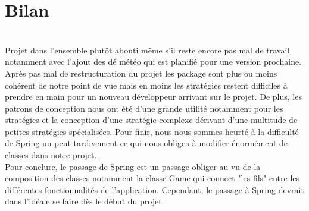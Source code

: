 \chapter{Bilan}

~\\Projet dans l'ensemble plutôt abouti même s'il reste encore pas mal de travail notamment avec l'ajout des dé météo qui est planifié pour une version prochaine. Après pas mal de restructuration du projet les package sont plus ou moins cohérent de notre point de vue mais en moins les stratégies restent difficiles à prendre en main pour un nouveau développeur arrivant sur le projet. De plus, les patrons de conception nous ont été d'une grande utilité notamment pour les stratégies et la conception d'une stratégie complexe dérivant d'une multitude de petites stratégies spécialisées. Pour finir, nous nous sommes heurté à la difficulté de Spring un peut tardivement ce qui nous obligea à modifier énormément de classes dans notre projet.\\

Pour conclure, le passage de Spring est un passage obliger au vu de la composition des classes notamment la classe Game qui connect "les fils" entre les différentes fonctionnalités de l'application. Cependant, le passage à Spring devrait dans l'idéale se faire dès le début du projet.